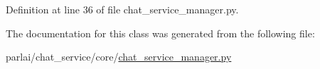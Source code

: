 Definition at line 36 of file chat\+\_\+service\+\_\+manager.\+py.



The documentation for this class was generated from the following file\+:\begin{DoxyCompactItemize}
\item 
parlai/chat\+\_\+service/core/\hyperlink{chat__service__manager_8py}{chat\+\_\+service\+\_\+manager.\+py}\end{DoxyCompactItemize}
